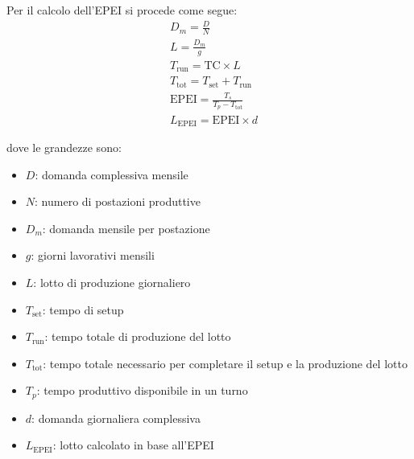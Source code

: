 \documentclass[11pt]{article}
\begin{document}
\noindent
Per il calcolo dell'EPEI si procede come segue:
\begin{align}
    & D_m = \frac{D}{N} \\
    & L = \frac{D_m}{g} \\
    & T_\text{run} = \text{TC} \times L \\
    & T_\text{tot} = T_\text{set} + T_\text{run} \\
    & \text{EPEI} = \frac{T_s}{T_p - T_\text{tot}} \\
    & L_\text{EPEI} = \text{EPEI} \times d
\end{align}

\vspace{1em}
\noindent
dove le grandezze sono:
\begin{itemize}
    \item $D$: domanda complessiva mensile
    \item $N$: numero di postazioni produttive
    \item $D_m$: domanda mensile per postazione
    \item $g$: giorni lavorativi mensili
    \item $L$: lotto di produzione giornaliero
    \item $T_\text{set}$: tempo di setup
    \item $T_\text{run}$: tempo totale di produzione del lotto
    \item $T_\text{tot}$: tempo totale necessario per completare il setup e la produzione del lotto
    \item $T_p$: tempo produttivo disponibile in un turno
    \item $d$: domanda giornaliera complessiva
    \item $L_{\text{EPEI}}$: lotto calcolato in base all'EPEI
\end{itemize}
\newpage
\end{document}
